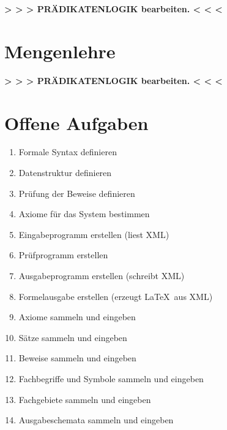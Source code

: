 \documentclass[english,ngerman,parskip=half,headsepline,footsepline]{scrreprt}
\begin{document}
	\par \textbf{> > > PRÄDIKATENLOGIK bearbeiten. < < <} %

	\section{Mengenlehre} %
	\label{Mengenlehre}

	\par \textbf{> > > PRÄDIKATENLOGIK bearbeiten. < < <} %

	\section{Offene Aufgaben} %
	\label{Offene Aufgaben}

	\begin{enumerate}
		\item Formale Syntax definieren
		\item Datenstruktur definieren
		\item Prüfung der Beweise definieren
		\item Axiome für das System bestimmen
		\item Eingabeprogramm erstellen (liest XML)
		\item Prüfprogramm erstellen
		\item Ausgabeprogramm erstellen (schreibt XML)
		\item Formelausgabe erstellen (erzeugt \LaTeX\ aus XML)
		\item Axiome sammeln und eingeben
		\item Sätze sammeln und eingeben
		\item Beweise sammeln und eingeben
		\item Fachbegriffe und Symbole sammeln und eingeben
		\item Fachgebiete sammeln und eingeben
		\item Ausgabeschemata sammeln und eingeben
	\end{enumerate}


    \clearpage


	\ihead{\textnormal{\textsf{\textbf{\listtablename}}}}
	\begin{minipage}{\textwidth-10.95pt}
    	\listoftables
    \end{minipage}\par
	\thispagestyle{scrheadings}
\end{document}
